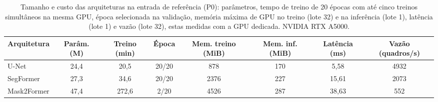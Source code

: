 \begin{table}[htbp]
\centering
\caption{Tamanho e custo das arquiteturas na entrada de referência (P0): parâmetros, tempo de treino de 20 épocas com até cinco treinos simultâneos na mesma GPU, época selecionada na validação, memória máxima de GPU no treino (lote 32) e na inferência (lote 1), latência (lote 1) e vazão (lote 32), estas medidas com a GPU dedicada. NVIDIA RTX A5000.}
\label{tab:custo}
\footnotesize\setlength{\tabcolsep}{3pt}
\begin{sbcfitwidth}
\begin{tabular}{lccccccc}
\toprule
Arquitetura & Parâm. (M) & Treino (min) & Época & Mem. treino (MiB) & Mem. inf. (MiB) & Latência (ms) & Vazão (quadros/s) \\
\midrule
U-Net & 24{,}4 & 20{,}5 & 20/20 & 878 & 170 & 5{,}58 & 4932 \\
SegFormer & 27{,}3 & 34{,}6 & 20/20 & 2376 & 227 & 15{,}61 & 2073 \\
Mask2Former & 47{,}4 & 272{,}6 & 2/20 & 4526 & 287 & 38{,}63 & 552 \\
\bottomrule
\end{tabular}
\end{sbcfitwidth}
\end{table}
